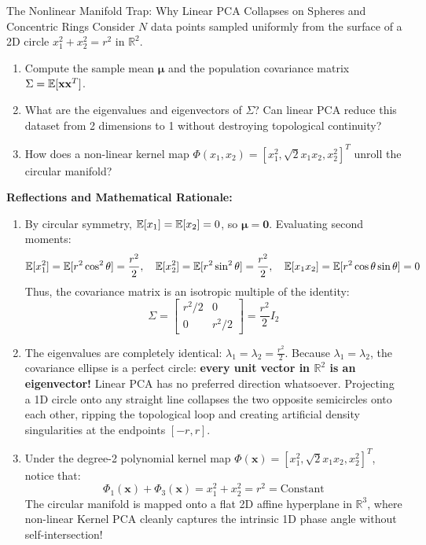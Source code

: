 \begin{ponderbox}{The Nonlinear Manifold Trap: Why Linear PCA Collapses on Spheres and Concentric Rings}
Consider $N$ data points sampled uniformly from the surface of a 2D circle $x_1^2 + x_2^2 = r^2$ in $\mathbb{R}^2$.
\begin{enumerate}
    \item Compute the sample mean $\boldsymbol{\mu}$ and the population covariance matrix $\Sigma = \operatorname{\mathbb{E}}[\mathbf{x}\mathbf{x}^T]$.
    \item What are the eigenvalues and eigenvectors of $\Sigma$? Can linear PCA reduce this dataset from 2 dimensions to 1 without destroying topological continuity?
    \item How does a non-linear kernel map $\Phi(x_1, x_2) = [x_1^2, \sqrt{2}x_1 x_2, x_2^2]^T$ unroll the circular manifold?
\end{enumerate}
\tcblower
\textbf{Reflections and Mathematical Rationale:}
\begin{enumerate}
    \item By circular symmetry, $\operatorname{\mathbb{E}}[x_1] = \operatorname{\mathbb{E}}[x_2] = 0$, so $\boldsymbol{\mu} = \mathbf{0}$.
    Evaluating second moments:
    \begin{equation*}
    \operatorname{\mathbb{E}}[x_1^2] = \operatorname{\mathbb{E}}[r^2 \cos^2\theta] = \frac{r^2}{2}, \quad \operatorname{\mathbb{E}}[x_2^2] = \operatorname{\mathbb{E}}[r^2 \sin^2\theta] = \frac{r^2}{2}, \quad \operatorname{\mathbb{E}}[x_1 x_2] = \operatorname{\mathbb{E}}[r^2 \cos\theta\sin\theta] = 0
    \end{equation*}
    Thus, the covariance matrix is an isotropic multiple of the identity:
    \begin{equation*}
    \Sigma = \begin{bmatrix} r^2/2 & 0 \\ 0 & r^2/2 \end{bmatrix} = \frac{r^2}{2} I_2
    \end{equation*}
    \item The eigenvalues are completely identical: $\lambda_1 = \lambda_2 = \frac{r^2}{2}$.
    Because $\lambda_1 = \lambda_2$, the covariance ellipse is a perfect circle: \textbf{every unit vector in $\mathbb{R}^2$ is an eigenvector!} Linear PCA has no preferred direction whatsoever. Projecting a 1D circle onto any straight line collapses the two opposite semicircles onto each other, ripping the topological loop and creating artificial density singularities at the endpoints $[-r, r]$.
    \item Under the degree-2 polynomial kernel map $\Phi(\mathbf{x}) = [x_1^2, \sqrt{2}x_1 x_2, x_2^2]^T$, notice that:
    \begin{equation*}
    \Phi_1(\mathbf{x}) + \Phi_3(\mathbf{x}) = x_1^2 + x_2^2 = r^2 = \text{Constant}
    \end{equation*}
    The circular manifold is mapped onto a flat 2D affine hyperplane in $\mathbb{R}^3$, where non-linear Kernel PCA cleanly captures the intrinsic 1D phase angle without self-intersection!
\end{enumerate}
\end{ponderbox}

